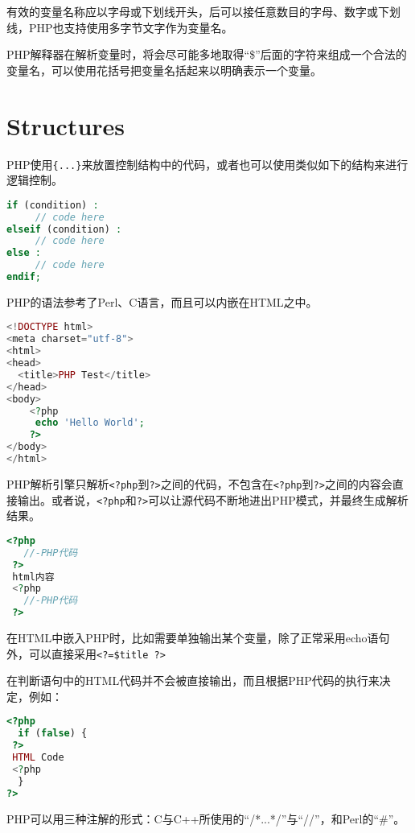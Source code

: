 有效的变量名称应以字母或下划线开头，后可以接任意数目的字母、数字或下划线，PHP也支持使用多字节文字作为变量名。

PHP解释器在解析变量时，将会尽可能多地取得“\$”后面的字符来组成一个合法的变量名，可以使用花括号把变量名括起来以明确表示一个变量。





\section{Structures}


PHP使用\texttt{\{...\}}来放置控制结构中的代码，或者也可以使用类似如下的结构来进行逻辑控制。

\begin{lstlisting}[language=PHP]
if (condition) :
     // code here
elseif (condition) :
     // code here
else :
     // code here
endif;
\end{lstlisting}






PHP的语法参考了Perl、C语言，而且可以内嵌在HTML之中。

\begin{lstlisting}[language=PHP]
<!DOCTYPE html>
<meta charset="utf-8">
<html>
<head>
  <title>PHP Test</title>
</head>
<body>
	<?php
	 echo 'Hello World';
	?>
</body>
</html>
\end{lstlisting}

PHP解析引擎只解析\texttt{<?php}到\texttt{?>}之间的代码，不包含在\texttt{<?php}到\texttt{?>}之间的内容会直接输出。或者说，\texttt{<?php}和\texttt{?>}可以让源代码不断地进出PHP模式，并最终生成解析结果。

\begin{lstlisting}[language=PHP]
 <?php
   //-PHP代码
 ?>
 html内容
 <?php
   //-PHP代码
 ?>
\end{lstlisting}



在HTML中嵌入PHP时，比如需要单独输出某个变量，除了正常采用echo语句外，可以直接采用\verb|<?=$title ?>|

在判断语句中的HTML代码并不会被直接输出，而且根据PHP代码的执行来决定，例如：


\begin{lstlisting}[language=PHP]
<?php
  if (false) {
 ?>
 HTML Code
 <?php
  }
?>
\end{lstlisting}

PHP可以用三种注解的形式：C与C++所使用的“/*...*/”与“//”，和Perl的“\#”。


